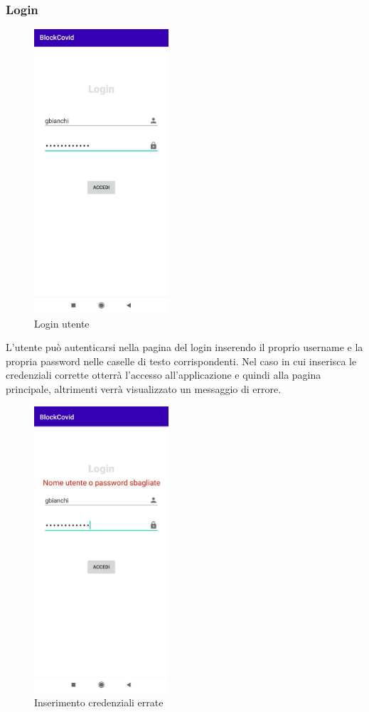 	\subsubsection{Login}
	\begin{figure}[H]
		\centering
		\includegraphics[width=5cm]{res/images/loginAddetto.png}
		\caption{Login utente}
	\end{figure}
	L'utente può autenticarsi nella pagina del login inserendo il proprio username e la propria password nelle caselle di testo corrispondenti.
	Nel caso in cui inserisca le credenziali corrette otterrà l'accesso all'applicazione e quindi alla pagina principale, altrimenti verrà visualizzato un messaggio di errore.
	\begin{figure}[H]
		\centering
		\includegraphics[width=5cm]{res/images/credenzialiErrateAddetto.png}
		\caption{Inserimento credenziali errate}
	\end{figure}
	
